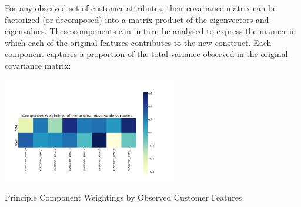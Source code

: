 \documentclass{tufte-handout}
\begin{document}
\noindent For any observed set of customer attributes, their covariance matrix can be factorized (or decomposed) into a matrix product of the eigenvectors and eigenvalues. These components can in turn be analysed to express the manner in which each of the original features contributes to the new construct. Each component captures a proportion of the total variance observed in the original covariance matrix:

\begin{marginfigure}
\includegraphics[width=3in, height=5.in]{Plots/pca_component_weights.png}
\caption{Principle Component Weightings by Observed Customer Features}
\end{marginfigure}
\end{document}

